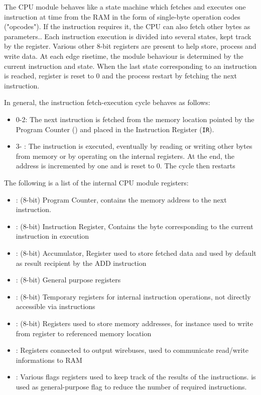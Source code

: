 The CPU module behaves like a state machine which fetches and executes one instruction at time from the RAM in the form of single-byte operation codes ("opcodes").
If the instruction requires it, the CPU can also fetch other bytes as parameters..
Each instruction execution is divided into several states, kept track by the  register.
Various other 8-bit registers are present to help store, process and write data.
At each  edge risetime, the module behaviour is determined by the current instruction and state.
When the last state corresponding to an instruction is reached,  register is reset to 0 and the process
restart by fetching the next instruction.

In general, the instruction fetch-execution cycle behaves as follows:
\begin{itemize}
    \item {} 0-2: The next instruction is fetched from the memory location pointed by the Program Counter () and placed in the Instruction Register (\texttt{IR}).
    \item {} 3- : The instruction is executed, eventually by reading or writing other bytes from memory or by operating on the internal registers. At the end, the  address is incremented by one and  is reset to 0. The cycle then restarts
\end{itemize}

The following is a list of the internal CPU module registers:
\begin{itemize}
    \item {}: (8-bit) Program Counter, contains the memory address to the next instruction.
    \item {}: (8-bit) Instruction Register, Contains the byte corresponding to the current instruction in execution
    \item {}: (8-bit) Accumulator, Register used to store fetched data and used by default as result recipient by the ADD instruction
    \item {}: (8-bit) General purpose registers
    \item {}: (8-bit) Temporary registers for internal instruction operations, not directly accessible via instructions
    \item {}: (8-bit) Registers used to store memory addresses, for instance used to write from register to referenced memory location
    \item {}: Registers connected to output wirebuses, used to communicate read/write informations to RAM
    \item {}: Various flags registers used to keep track of the results of the instructions.
     is used as general-purpose flag to reduce the number of required instructions.
\end{itemize}

